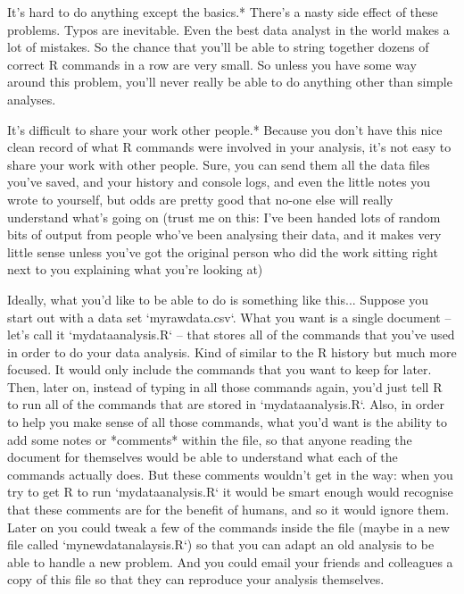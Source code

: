 \item* It's hard to do anything except the basics.* There's a nasty side effect of these problems. Typos are inevitable. Even the best data analyst in the world makes a lot of mistakes. So the chance that you'll be able to string together dozens of correct R commands in a row are very small. So unless you have some way around this problem, you'll never really be able to do anything other than simple analyses. 

\item *It's difficult to share your work other people.* Because you don't have this nice clean record of what R commands were involved in your analysis, it's not easy to share your work with other people. Sure, you can send them all the data files you've saved, and your history and console logs, and even the little notes you wrote to yourself, but odds are pretty good that no-one else will really understand what's going on (trust me on this: I've been handed lots of random bits of output from people who've been analysing their data, and it makes very little sense unless you've got the original person who did the work sitting right next to you explaining what you're looking at)


Ideally, what you'd like to be able to do is something like this... Suppose you start out with a data set `myrawdata.csv`. What you want is a single document -- let's call it `mydataanalysis.R` -- that stores all of the commands that you've used in order to do your data analysis. Kind of similar to the R history but much more focused. It would only include the commands that you want to keep for later. Then, later on, instead of typing in all those commands again, you'd just tell R to run all of the commands that are stored in `mydataanalysis.R`. Also, in order to help you make sense of all those commands, what you'd want is the ability to add some notes or *comments* within the file, so that anyone reading the document for themselves would be able to understand what each of the commands actually does. But these comments wouldn't get in the way: when you try to get R to run `mydataanalysis.R` it would be smart enough would recognise that these comments are for the benefit of humans, and so it would ignore them. Later on you could tweak a few of the commands inside the file (maybe in a new file called `mynewdatanalaysis.R`) so that you can adapt an old analysis to be able to handle a new problem. And you could email your friends and colleagues a copy of this file so that they can reproduce your analysis themselves. 

